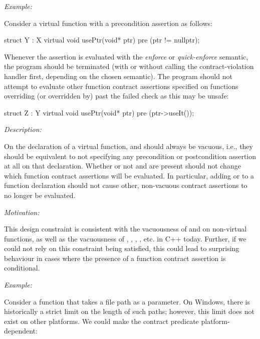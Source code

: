 \emph{Example:}

Consider a virtual function with a precondition assertion as follows:

\begin{codeblock}
struct Y : X {
  virtual void usePtr(void* ptr) 
    pre (ptr != nullptr);
}
\end{codeblock}

Whenever the assertion \mbox{} is evaluated with the \emph{enforce} or \emph{quick-enforce} semantic, the program should be terminated (with or without calling the contract-violation handler first, depending on the chosen semantic). The program should not attempt to evaluate other function contract assertions specified on functions overriding (or overridden by)  past the failed check as this may be unsafe:

\begin{codeblock}
struct Z : Y {
  virtual void usePtr(void* ptr) 
    pre (ptr->useIt());
}
\end{codeblock}


\emph{Description:} 

On the declaration of a virtual function,  and  should always be vacuous, i.e., they should be equivalent to not specifying any precondition or postcondition assertion at all on that declaration. Whether or not  and  are present should not change which function contract assertions will be evaluated. In particular, adding  or  to a function declaration should not cause other, non-vacuous contract assertions to no longer be evaluated.

\emph{Motivation:}

This design constraint is consistent with the vacuousness of  and  on non-virtual functions, as well as the vacuousness of , \mbox{}, \mbox{}, , etc. in C++ today. Further, if we could not rely on this constraint being satisfied, this could lead to surprising behaviour in cases where the presence of a function contract assertion is conditional.

\emph{Example:}

Consider a function that takes a file path as a parameter. On Windows, there is historically a strict limit on the length of such paths; however, this limit does not exist on other platforms. We could make the contract predicate platform-dependent:

